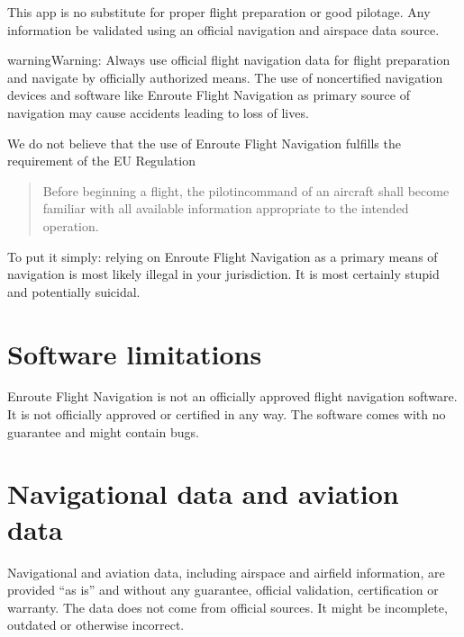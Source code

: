 \documentclass[letterpaper,10pt,english]{sphinxmanual}
\begin{document}
This app is no substitute for proper flight preparation or good pilotage.  Any
information  be validated using an official navigation and
airspace data source.

\begin{sphinxadmonition}{warning}{Warning:}
Always use official flight navigation data for flight preparation
and navigate by officially authorized means. The use of non\sphinxhyphen{}certified
navigation devices and software like Enroute Flight Navigation as primary
source of navigation may cause accidents leading to loss of lives.
\end{sphinxadmonition}

We do not believe that the use of Enroute Flight Navigation fulfills the
requirement of the EU Regulation 
\begin{quote}

Before beginning a flight, the pilot\sphinxhyphen{}in\sphinxhyphen{}command of an aircraft shall become
familiar with all available information appropriate to the intended operation.
\end{quote}

To put it simply: relying on Enroute Flight Navigation as a primary means of
navigation is most likely illegal in your jurisdiction.  It is most certainly
stupid and potentially suicidal.


\section{Software limitations}
\label{\detokenize{01-intro/think:software-limitations}}
Enroute Flight Navigation is not an officially approved flight navigation
software.  It is not officially approved or certified in any way.  The software
comes with no guarantee and might contain bugs.


\section{Navigational data and aviation data}
\label{\detokenize{01-intro/think:navigational-data-and-aviation-data}}
Navigational\textendash{} and aviation data, including airspace and airfield information,
are provided “as is” and without any guarantee, official validation,
certification or warranty.  The data does not come from official sources.  It
might be incomplete, outdated or otherwise incorrect.
\end{document}
